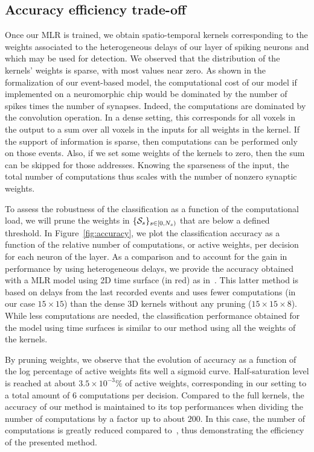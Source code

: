 \documentclass[default]{sn-jnl}%
\theoremstyle{thmstyleone}%
\theoremstyle{thmstyletwo}%
\theoremstyle{thmstylethree}%
\begin{document}
\subsection{Accuracy efficiency trade-off}%

Once our MLR is trained, we obtain spatio-temporal kernels corresponding to the weights associated to the heterogeneous delays of our layer of spiking neurons and which may be used for detection. We observed that the distribution of the kernels' weights is sparse, with most values near zero. As shown in the formalization of our event-based model, the computational cost of our model if implemented on a neuromorphic chip would be dominated by the number of spikes times the number of synapses. Indeed, the computations are dominated by the convolution operation. In a dense setting, this corresponds for all voxels in the output to a sum over all voxels in the inputs for all weights in the kernel. If the support of information is sparse, then computations can be performed only on those events. Also, if we set some weights of the kernels to zero, then the sum can be skipped for those addresses. Knowing the sparseness of the input, the total number of computations thus scales with the number of nonzero synaptic weights. 

To assess the robustness of the classification as a function of the computational load, we will prune the weights in $\{\mathcal{S}_s\}_{s \in [0,N_{s})}$ that are below a defined threshold. In Figure~\ref{fig:accuracy}, we plot the classification accuracy as a function of the relative number of computations, or active weights, per decision for each neuron of the layer. As a comparison and to account for the gain in performance by using heterogeneous delays, we provide the accuracy obtained with a MLR model using 2D time surface (in red) as in~\citep{grimaldi_robust_2022}. This latter method is based on delays from the last recorded events and uses fewer computations (in our case $15\times15$) than the dense 3D kernels without any pruning ($15\times15\times8$). While less computations are needed, the classification performance obtained for the model using time surfaces is similar to our method using all the weights of the kernels.

By pruning weights, we observe that the evolution of accuracy as a function of the log percentage of active weights fits well a sigmoid curve. Half-saturation level is reached at about $3.5\times 10^{-3}\%$ of active weights, corresponding in our setting to a total amount of $6$ computations per decision. Compared to the full kernels, the accuracy of our method is maintained to its top performances when dividing the number of computations by a factor up to about $200$. In this case, the number of computations is greatly reduced compared to~\citep{grimaldi_robust_2022}, thus demonstrating the efficiency of the presented method. 
\end{document}
